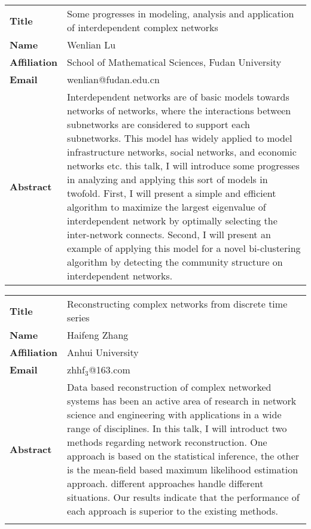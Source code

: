\documentclass[oneside,A4paper,12pt]{article}
\begin{document}
\newpage
\begin{longtable}{p{2cm}p{14cm}}
\toprule
\textbf{Title} & Some progresses in modeling, analysis and application of interdependent complex networks\\
\textbf{Name} & Wenlian Lu\\
\textbf{Affiliation} & School of Mathematical Sciences, Fudan University\\
\textbf{Email} & wenlian@fudan.edu.cn\\
\textbf{Abstract} & Interdependent networks are of basic models towards networks of networks, where the interactions between subnetworks are considered to support each subnetworks. This model has widely applied to model infrastructure networks, social networks, and economic networks etc. this talk, I will introduce some progresses in analyzing and applying this sort of models in twofold. First, I will present a simple and efficient algorithm to maximize the largest eigenvalue of interdependent network by optimally selecting the inter-network connects. Second, I will present an example of applying this model for a novel bi-clustering algorithm by detecting the community structure on interdependent networks.\\
\bottomrule
\end{longtable}

\newpage
\begin{longtable}{p{2cm}p{14cm}}
\toprule
\textbf{Title} & Reconstructing complex networks from discrete time series\\
\textbf{Name} & Haifeng Zhang\\
\textbf{Affiliation} & Anhui University\\
\textbf{Email} & zhhf\(_{\text{3}}\)@163.com\\
\textbf{Abstract} & Data based reconstruction of complex networked systems has been an active area of research in network science and engineering with applications in a wide range of disciplines. In this talk, I will introduct two methods regarding network reconstruction. One approach is based on the statistical inference, the other is the mean-field based maximum likelihood estimation approach. different approaches handle different situations. Our results indicate that the performance of each approach is superior to the existing methods.\\
\\
\bottomrule
\end{longtable}
\end{document}
